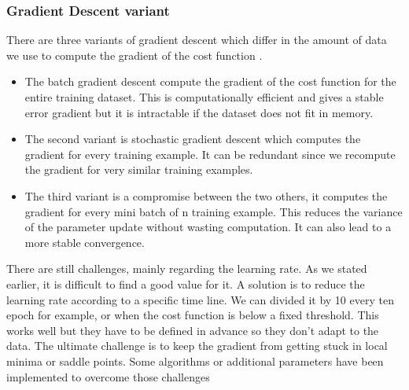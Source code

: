 \subsubsection{Gradient Descent variant}
There are three variants of gradient descent which differ in the amount of data we use to compute the gradient of the cost function \cite{gradient}. 
\begin{itemize}
    \item The batch gradient descent compute the gradient of the cost function for the entire training dataset. This is computationally efficient and gives a stable error gradient but it is intractable if the dataset does not fit in memory. 
    \item The second variant is stochastic gradient descent which computes the gradient for every training example. It can be redundant since we recompute the gradient for very similar training examples.
    \item The third variant is a compromise between the two others, it computes the gradient for every mini batch of n training example. This reduces the variance of the parameter update without wasting computation. It can also lead to a more stable convergence.
\end{itemize}There are still challenges, mainly regarding the learning rate. As we stated earlier, it is difficult to find a good value for it. A solution is to reduce the learning rate according to a specific time line. We can divided it by 10 every ten epoch for example, or when the cost function is below a fixed threshold. This works well but they have to be defined in advance so they don't adapt to the data. The ultimate challenge is to keep the gradient from getting stuck in local minima or saddle points. Some algorithms or additional parameters have been implemented to overcome those challenges
